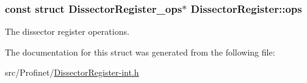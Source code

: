 \subsubsection[{ops}]{\setlength{\rightskip}{0pt plus 5cm}const struct {\bf Dissector\+Register\+\_\+ops}$\ast$ Dissector\+Register\+::ops}\label{struct_dissector_register_acb5f585a3d5d7dbeca84a74990bbaad8}
The dissector register operations. 

The documentation for this struct was generated from the following file\+:\begin{DoxyCompactItemize}
\item 
src/\+Profinet/\hyperlink{_dissector_register-int_8h}{Dissector\+Register-\/int.\+h}\end{DoxyCompactItemize}
